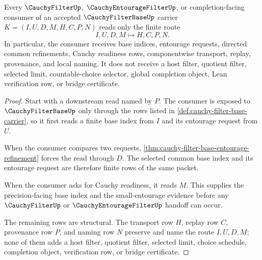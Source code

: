 \begin{theorem}
\label{thm:cauchy-filter-base-completion-handoff}
Every $\CauchyFilterUp$, $\CauchyEntourageFilterUp$, or completion-facing consumer of an accepted $\CauchyFilterBaseUp$ carrier $K=(I,U,D,M,H,C,P,N)$ reads only the finite route
$$
I,U,D,M \longmapsto H,C,P,N .
$$
In particular, the consumer receives base indices, entourage requests, directed common refinements, Cauchy readiness rows, componentwise transport, replay, provenance, and local naming. It does not receive a host filter, quotient filter, selected limit, countable-choice selector, global completion object, Lean verification row, or bridge certificate.
\end{theorem}
\begin{proof}
Start with a downstream read named by $P$. The consumer is exposed to $\CauchyFilterBaseUp$ only through the rows listed in \autoref{def:cauchy-filter-base-carrier}, so it first reads a finite base index from $I$ and its entourage request from $U$.

When the consumer compares two requests, \autoref{thm:cauchy-filter-base-entourage-refinement} forces the read through $D$. The selected common base index and its entourage request are therefore finite rows of the same packet.

When the consumer asks for Cauchy readiness, it reads $M$. This supplies the precision-facing base index and the small-entourage evidence before any $\CauchyFilterUp$ or $\CauchyEntourageFilterUp$ handoff can occur.

The remaining rows are structural. The transport row $H$, replay row $C$, provenance row $P$, and naming row $N$ preserve and name the route $I,U,D,M$; none of them adds a host filter, quotient filter, selected limit, choice schedule, completion object, verification row, or bridge certificate.
\end{proof}


\begin{closurestatus}{\CauchyFilterBaseUp}
  \theoryclosure{\seedClosure}
  \formalstatus{\unformalizedV}
\end{closurestatus}
